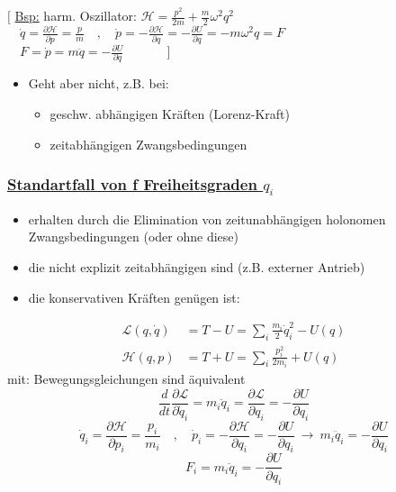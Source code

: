 \documentclass[titlepage,12pt,a4paper,ngerman]{report}
\newcommand{\lag}{\mathcal{L}}
\newcommand{\ham}{\mathcal{H}}
\begin{document}
$\bigg[$ \underline{Bsp:} harm. Oszillator: $ \ham = \frac{p^2}{2 m} + \frac{m}{2} \omega^2 q^2 $\\
$\phantom{\quad} \dot{q} = \frac{\partial \ham}{\partial p} = \frac{p}{m} \quad , \quad \dot{p} = - \frac{\partial \ham}{\partial q} = - \frac{\partial U}{\partial q} = - m \omega^2 q = F$\\
$\phantom{\quad} F = \dot{p} = m \ddot{q} = - \frac{\partial U}{\partial q} \qquad \quad \ \: \bigg] $
\begin{itemize}
	\item Geht aber nicht, z.B. bei:
	\begin{itemize}
		\item geschw. abhängigen Kräften (Lorenz-Kraft)
		\item zeitabhängigen Zwangsbedingungen
	\end{itemize}
\end{itemize}
\subsubsection{\underline{Standartfall von f Freiheitsgraden $ q_i $}}
\begin{itemize}
	\item erhalten durch die Elimination von zeitunabhängigen holonomen Zwangsbedingungen (oder ohne diese)
	\item die nicht explizit zeitabhängigen sind (z.B. externer Antrieb)
	\item die konservativen Kräften genügen ist:
\end{itemize}
\begin{align*}
\lag(q,\dot{q}) &= T  - U = \sum_i \frac{m_i}{2} \dot{q}^2_i - U(q)\\
\ham(q,p) &= T + U = \sum_i \frac{p_i^2}{2 m_i} + U(q)
\end{align*}
mit: Bewegungsgleichungen sind äquivalent
$$ \frac{d}{dt} \frac{\partial \lag}{\partial \dot{q}_i} = m_i \ddot{q}_i = \frac{\partial \lag}{\partial q_i} = - \frac{\partial U}{\partial q_i} $$
$$ \dot{q}_i = \frac{\partial \ham}{\partial p_i} = \frac{p_i}{m_i} \quad , \quad \dot{p}_i = - \frac{\partial \ham}{\partial q_i} = - \frac{\partial U}{\partial q_i} \ \rightarrow \ m_i \ddot{q}_i = - \frac{\partial U}{\partial q_i}$$
$$F_i = m_i \ddot{q}_i = -\frac{\partial U}{\partial q_i}$$
\end{document}
